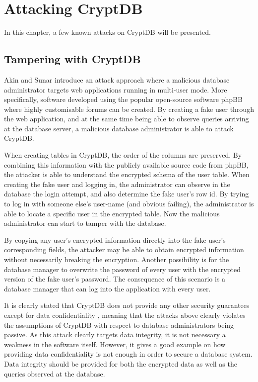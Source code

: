 \chapter{Attacking CryptDB}
\label{chp:attacks}

In this chapter, a few known attacks on CryptDB will be presented.

\section{Tampering with CryptDB}

Akin and Sunar \cite{akin_2014} introduce an attack approach where a malicious database administrator targets web applications running in multi-user mode. More specifically, software developed using the popular open-source software phpBB \cite{phpBB} where highly customisable forums can be created. By creating a fake user through the web application, and at the same time being able to observe queries arriving at the database server, a malicious database administrator is able to attack CryptDB.

When creating tables in CryptDB, the order of the columns are preserved. By combining this information with the publicly available source code from phpBB, the attacker is able to understand the encrypted schema of the user table. When creating the fake user and logging in, the administrator can observe in the database the login attempt, and also determine the fake user's row id. By trying to log in with someone else's user-name (and obvious failing), the administrator is able to locate a specific user in the encrypted table. Now the malicious administrator can start to tamper with the database.

By copying any user's encrypted information directly into the fake user's corresponding fields, the attacker may be able to obtain encrypted information without necessarily breaking the encryption. Another possibility is for the database manager to overwrite the password of every user with the encrypted version of the fake user's password. The consequence of this scenario is a database manager that can log into the application with every user.

It is clearly stated that CryptDB does not provide any other security guarantees except for data confidentiality \cite{CryptDB_Main_Paper}, meaning that the attacks above clearly violates the assumptions of CryptDB with respect to database administrators being passive. As this attack clearly targets data integrity, it is not necessary a weakness in the software itself. However, it gives a good example on how providing data confidentiality is not enough in order to secure a database system. Data integrity should be provided for both the encrypted data as well as the queries observed at the database.
 

